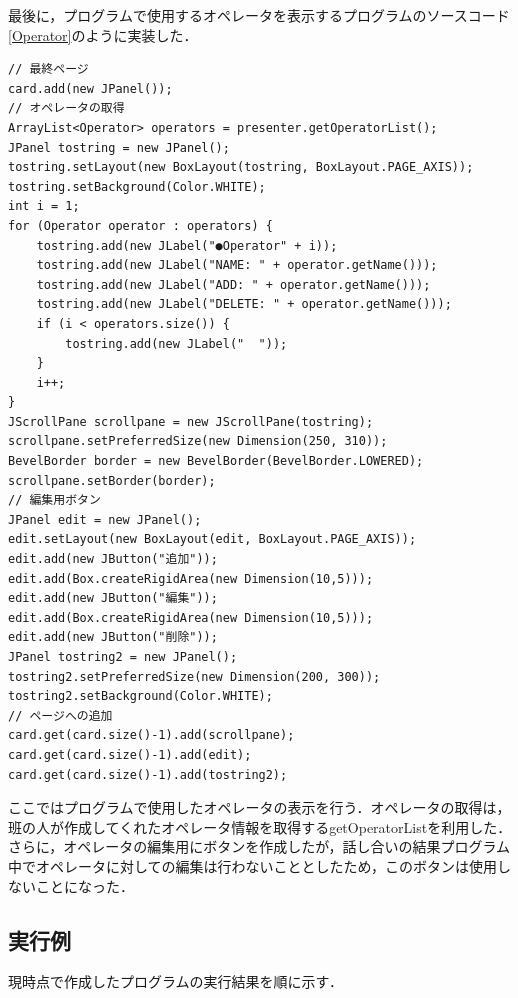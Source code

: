 \documentclass[12pt]{jarticle}
\begin{document}
最後に，プログラムで使用するオペレータを表示するプログラムのソースコード\ref{Operator}のように実装した．
\begin{lstlisting}[caption=オペレータの表示,label=Operator]
// 最終ページ
card.add(new JPanel());
// オペレータの取得
ArrayList<Operator> operators = presenter.getOperatorList();
JPanel tostring = new JPanel();
tostring.setLayout(new BoxLayout(tostring, BoxLayout.PAGE_AXIS));
tostring.setBackground(Color.WHITE);
int i = 1;
for (Operator operator : operators) {
	tostring.add(new JLabel("●Operator" + i));
	tostring.add(new JLabel("NAME: " + operator.getName()));
	tostring.add(new JLabel("ADD: " + operator.getName()));
	tostring.add(new JLabel("DELETE: " + operator.getName()));
	if (i < operators.size()) {
		tostring.add(new JLabel("  "));
	}
	i++;
}
JScrollPane scrollpane = new JScrollPane(tostring);
scrollpane.setPreferredSize(new Dimension(250, 310));
BevelBorder border = new BevelBorder(BevelBorder.LOWERED);
scrollpane.setBorder(border);
// 編集用ボタン
JPanel edit = new JPanel();
edit.setLayout(new BoxLayout(edit, BoxLayout.PAGE_AXIS));
edit.add(new JButton("追加"));
edit.add(Box.createRigidArea(new Dimension(10,5)));
edit.add(new JButton("編集"));
edit.add(Box.createRigidArea(new Dimension(10,5)));
edit.add(new JButton("削除"));
JPanel tostring2 = new JPanel();
tostring2.setPreferredSize(new Dimension(200, 300));
tostring2.setBackground(Color.WHITE);
// ページへの追加
card.get(card.size()-1).add(scrollpane);
card.get(card.size()-1).add(edit);
card.get(card.size()-1).add(tostring2);
\end{lstlisting}
ここではプログラムで使用したオペレータの表示を行う．オペレータの取得は，班の人が作成してくれたオペレータ情報を取得するgetOperatorListを利用した．さらに，オペレータの編集用にボタンを作成したが，話し合いの結果プログラム中でオペレータに対しての編集は行わないこととしたため，このボタンは使用しないことになった．

\subsection{実行例}
現時点で作成したプログラムの実行結果を順に示す．\\
\end{document}
